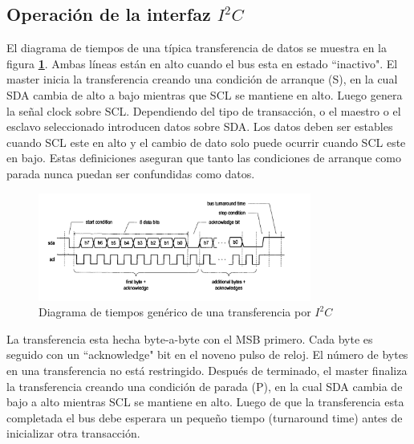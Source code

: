 \documentclass[11pt, a4paper]{article}
\begin{document}
		\subsection{Operación de la interfaz $I^{2}C$}
			El diagrama de tiempos de una típica transferencia de datos se muestra en la figura \textcolor{blue}{\textbf{\ref{fig:basic_timing}}}. Ambas líneas están en alto cuando el bus esta en estado ``inactivo". El master inicia la transferencia creando una condición de arranque (S), en la cual SDA cambia de alto a bajo mientras que SCL se mantiene en alto. Luego genera la señal clock sobre SCL. Dependiendo del tipo de transacción, o el maestro o el esclavo seleccionado introducen datos sobre SDA. Los datos deben ser estables cuando SCL este en alto y el cambio de dato solo puede ocurrir cuando SCL este en bajo. Estas definiciones aseguran que tanto las condiciones de arranque como parada nunca puedan ser confundidas como datos.
			
		\begin{figure}[H]
			\centering
			\includegraphics[width=0.8\textwidth]{Imagenes/basic_timing.png}
			\caption{Diagrama de tiempos genérico de una transferencia por $I^{2}C$}
			\label{fig:basic_timing}
		\end{figure} 

			La transferencia esta hecha byte-a-byte con el MSB primero. Cada byte es seguido con un ``acknowledge" bit en el noveno pulso de reloj. El número de bytes en una transferencia no está restringido. Después de terminado, el master finaliza la transferencia creando una condición de parada (P), en la cual SDA cambia de bajo a alto mientras SCL se mantiene en alto. Luego de que la transferencia esta completada el bus debe esperara un pequeño tiempo (turnaround time) antes de inicializar otra transacción.
\end{document}
